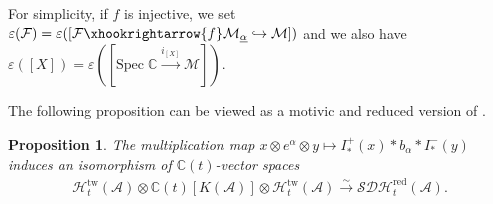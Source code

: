 \documentclass[12pt]{amsart}
\newtheorem{proposition}[theorem]{Proposition}
\theoremstyle{definition}
\numberwithin{equation}{section}
\begin{document}
For simplicity, if $ f $ is injective, we set $ \varepsilon(\mathcal{F}) = \varepsilon([\mathcal{F} \xhookrightarrow{f} \mathcal{M}_{\underline{\alpha}} \hookrightarrow \mathcal{M}])  $ and we also have $ \varepsilon([X]) = \varepsilon([\mathrm{Spec}\;\mathbb{C}\xrightarrow{i_{[X]}} \mathcal{M}]) $.

The following proposition can be viewed as a motivic and reduced version of \cite[Theorem 3.25]{LP21}. 

\begin{proposition}
    \label{Triangular decomposition of SDH_t}
    The multiplication map $ x \otimes e^{\alpha} \otimes  y \mapsto I^+_{*}(x) * b_{\alpha} * I^-_{*}(y) $ induces an isomorphism of $ \mathbb{C}(t) $-vector spaces
    \begin{align*}
         \mathcal{H}_t^{\mathrm{tw}}(\mathcal{A}) \otimes \mathbb{C}(t)[K(\mathcal{A})] \otimes \mathcal{H}_t^{\mathrm{tw}}(\mathcal{A})  \xrightarrow{\sim} \mathcal{SDH}^{\mathrm{red}}_t(\mathcal{A}).
    \end{align*}
\end{proposition}
\end{document}
